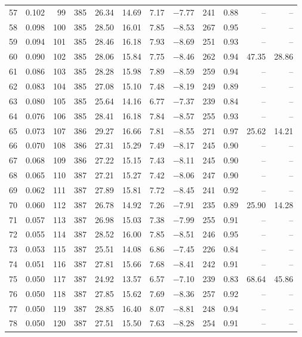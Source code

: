 \begin{table}[H]
\begin{tabular}{rrrrrrrrrrrr}
57 & 0.102 & 99 & 385 & 26.34 & 14.69 & 7.17 & $-$7.77 & 241 & 0.88 & -- & -- \\
58 & 0.098 & 100 & 385 & 28.50 & 16.01 & 7.85 & $-$8.53 & 267 & 0.95 & -- & -- \\
59 & 0.094 & 101 & 385 & 28.46 & 16.18 & 7.93 & $-$8.69 & 251 & 0.93 & -- & -- \\
60 & 0.090 & 102 & 385 & 28.06 & 15.84 & 7.75 & $-$8.46 & 262 & 0.94 & 47.35 & 28.86 \\
61 & 0.086 & 103 & 385 & 28.28 & 15.98 & 7.89 & $-$8.59 & 259 & 0.94 & -- & -- \\
62 & 0.083 & 104 & 385 & 27.08 & 15.10 & 7.48 & $-$8.19 & 249 & 0.89 & -- & -- \\
63 & 0.080 & 105 & 385 & 25.64 & 14.16 & 6.77 & $-$7.37 & 239 & 0.84 & -- & -- \\
64 & 0.076 & 106 & 385 & 28.41 & 16.18 & 7.84 & $-$8.57 & 255 & 0.93 & -- & -- \\
65 & 0.073 & 107 & 386 & 29.27 & 16.66 & 7.81 & $-$8.55 & 271 & 0.97 & 25.62 & 14.21 \\
66 & 0.070 & 108 & 386 & 27.31 & 15.29 & 7.49 & $-$8.17 & 245 & 0.90 & -- & -- \\
67 & 0.068 & 109 & 386 & 27.22 & 15.15 & 7.43 & $-$8.11 & 245 & 0.90 & -- & -- \\
68 & 0.065 & 110 & 387 & 27.21 & 15.27 & 7.42 & $-$8.06 & 247 & 0.90 & -- & -- \\
69 & 0.062 & 111 & 387 & 27.89 & 15.81 & 7.72 & $-$8.45 & 241 & 0.92 & -- & -- \\
70 & 0.060 & 112 & 387 & 26.78 & 14.92 & 7.26 & $-$7.91 & 235 & 0.89 & 25.90 & 14.28 \\
71 & 0.057 & 113 & 387 & 26.98 & 15.03 & 7.38 & $-$7.99 & 255 & 0.91 & -- & -- \\
72 & 0.055 & 114 & 387 & 28.52 & 16.00 & 7.85 & $-$8.51 & 246 & 0.95 & -- & -- \\
73 & 0.053 & 115 & 387 & 25.51 & 14.08 & 6.86 & $-$7.45 & 226 & 0.84 & -- & -- \\
74 & 0.051 & 116 & 387 & 27.81 & 15.66 & 7.68 & $-$8.41 & 242 & 0.91 & -- & -- \\
75 & 0.050 & 117 & 387 & 24.92 & 13.57 & 6.57 & $-$7.10 & 239 & 0.83 & 68.64 & 45.86 \\
76 & 0.050 & 118 & 387 & 27.85 & 15.62 & 7.69 & $-$8.36 & 257 & 0.92 & -- & -- \\
77 & 0.050 & 119 & 387 & 28.85 & 16.40 & 8.07 & $-$8.81 & 248 & 0.94 & -- & -- \\
78 & 0.050 & 120 & 387 & 27.51 & 15.50 & 7.63 & $-$8.28 & 254 & 0.91 & -- & -- \\

\end{tabular}
\end{table}
